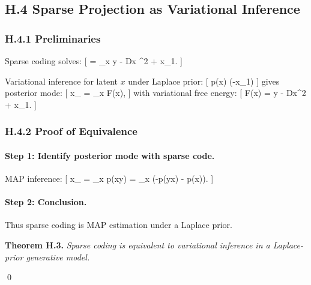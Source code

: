 \documentclass[11pt,a4paper,twoside]{article}
\begin{document}
\subsection*{H.4 Sparse Projection as Variational Inference}

\subsubsection*{H.4.1 Preliminaries}

Sparse coding solves:
[
 = \arg\min_x \lVert y - Dx \rVert^2 + \lambda \lVert x\rVert_1.
]

Variational inference for latent $x$ under Laplace prior:
[
p(x) \propto \exp(-\lambda \lVert x\rVert_1)
]
gives posterior mode:
[
x_{} = \arg\min_x F(x),
]
with variational free energy:
[
F(x) = \lVert y - Dx\rVert^2 + \lambda\lVert x\rVert_1.
]

\subsubsection*{H.4.2 Proof of Equivalence}

\paragraph{Step 1: Identify posterior mode with sparse code.}

MAP inference:
[
x_{}
= \arg\max_x p(x\mid y)
= \arg\min_x \big(-\ln p(y\mid x) - \ln p(x)\big).
]

\paragraph{Step 2: Conclusion.}

Thus sparse coding is MAP estimation under a Laplace prior.

\medskip

\noindent\textbf{Theorem H.3.}
\emph{Sparse coding is equivalent to variational inference in a Laplace-prior generative model.}

\qed

\begin{center}
\end{center}
\end{document}

